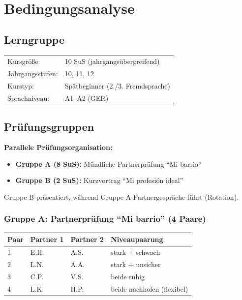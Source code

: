 \documentclass[11pt,a4paper]{article}
\begin{document}
\section{Bedingungsanalyse}

\subsection{Lerngruppe}
\begin{tabular}{ll}
    Kursgröße: & 10 SuS (jahrgangsübergreifend) \\
    Jahrgangsstufen: & 10, 11, 12 \\
    Kurstyp: & Spätbeginner (2./3. Fremdsprache) \\
    Sprachniveau: & A1--A2 (GER) \\
\end{tabular}

\subsection{Prüfungsgruppen}

\begin{warnbox}
\textbf{Parallele Prüfungsorganisation:}
\begin{itemize}
    \item \textbf{Gruppe A (8 SuS):} Mündliche Partnerprüfung ``Mi barrio''
    \item \textbf{Gruppe B (2 SuS):} Kurzvortrag ``Mi profesión ideal''
\end{itemize}
Gruppe B präsentiert, während Gruppe A Partnergespräche führt (Rotation).
\end{warnbox}

\subsubsection{Gruppe A: Partnerprüfung ``Mi barrio'' (4 Paare)}

\begin{tabular}{|l|l|l|p{5cm}|}
\hline
\textbf{Paar} & \textbf{Partner 1} & \textbf{Partner 2} & \textbf{Niveaupaarung} \\
\hline
1 & E.H. & A.S. & stark + schwach \\
\hline
2 & L.N. & A.A. & stark + unsicher \\
\hline
3 & C.P. & V.S. & beide ruhig \\
\hline
4 & L.K. & H.P. & beide nachholen (flexibel) \\
\hline
\end{tabular}
\end{document}

